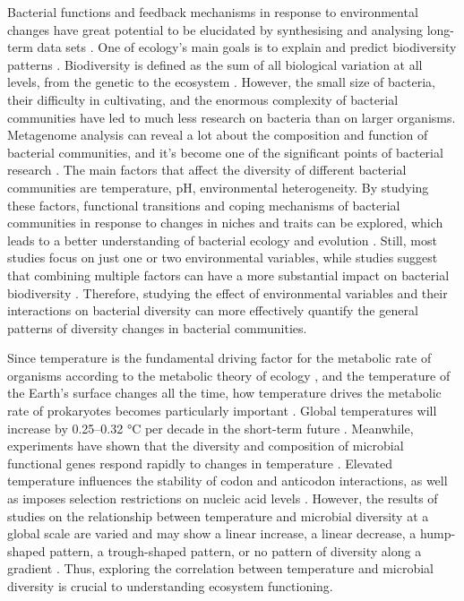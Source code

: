 \documentclass[11pt, a4paper]{article}
\begin{document}
\begin{spacing}{1.5}
Bacterial functions and feedback mechanisms in response to environmental changes have great potential to be elucidated by synthesising and analysing long-term data sets \citep{buttigieg2018marine, dore2009physical, saba2010challenges}. One of ecology's main goals is to explain and predict biodiversity patterns \citep{mcgill2010towards}. Biodiversity is defined as the sum of all biological variation at all levels, from the genetic to the ecosystem \citep{purvis2000getting}. However, the small size of bacteria, their difficulty in cultivating, and the enormous complexity of bacterial communities have led to much less research on bacteria than on larger organisms. Metagenome analysis can reveal a lot about the composition and function of bacterial communities, and it's become one of the significant points of bacterial research \citep{mitchell2018ebi}. The main factors that affect the diversity of different bacterial communities are temperature, pH, environmental heterogeneity. By studying these factors, functional transitions and coping mechanisms of bacterial communities in response to changes in niches and traits can be explored, which leads to a better understanding of bacterial ecology and evolution \citep{lozupone2007global}. Still, most studies focus on just one or two environmental variables, while studies suggest that combining multiple factors can have a more substantial impact on bacterial biodiversity \citep{rillig2019role}. Therefore, studying the effect of environmental variables and their interactions on bacterial diversity can more effectively quantify the general patterns of diversity changes in bacterial communities.

Since temperature is the fundamental driving factor for the metabolic rate of organisms according to the metabolic theory of ecology   \citep{brown2004toward}, and the temperature of the Earth's surface changes all the time, how temperature drives the metabolic rate of prokaryotes becomes particularly important \citep{thompson2017communal}. Global temperatures will increase by 0.25–0.32 °C per decade in the short-term future \citep{smith2018predicted}. Meanwhile, experiments have shown that the diversity and composition of microbial functional genes respond rapidly to changes in temperature \citep{barria2013bacterial, wu2017alpine, xue2016tundra}. Elevated temperature influences the stability of codon and anticodon interactions, as well as imposes selection restrictions on nucleic acid levels \citep{basak2005origin}. However, the results of studies on the relationship between temperature and microbial diversity at a global scale are varied and may show a linear increase, a linear decrease, a hump-shaped pattern, a trough-shaped pattern, or no pattern of diversity along a gradient \citep{garcia2013temperature, hendershot2017consistently, zhou2016temperature}. Thus, exploring the correlation between temperature and microbial diversity is crucial to understanding ecosystem functioning.


\end{spacing}
\end{document}
